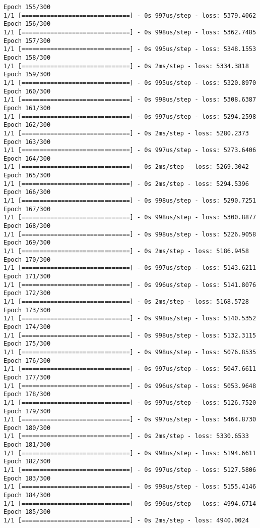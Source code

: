 \documentclass[11pt]{article}
\begin{document}
\begin{Verbatim}[commandchars=\\\{\}]
Epoch 155/300
1/1 [==============================] - 0s 997us/step - loss: 5379.4062
Epoch 156/300
1/1 [==============================] - 0s 998us/step - loss: 5362.7485
Epoch 157/300
1/1 [==============================] - 0s 995us/step - loss: 5348.1553
Epoch 158/300
1/1 [==============================] - 0s 2ms/step - loss: 5334.3818
Epoch 159/300
1/1 [==============================] - 0s 995us/step - loss: 5320.8970
Epoch 160/300
1/1 [==============================] - 0s 998us/step - loss: 5308.6387
Epoch 161/300
1/1 [==============================] - 0s 997us/step - loss: 5294.2598
Epoch 162/300
1/1 [==============================] - 0s 2ms/step - loss: 5280.2373
Epoch 163/300
1/1 [==============================] - 0s 997us/step - loss: 5273.6406
Epoch 164/300
1/1 [==============================] - 0s 2ms/step - loss: 5269.3042
Epoch 165/300
1/1 [==============================] - 0s 2ms/step - loss: 5294.5396
Epoch 166/300
1/1 [==============================] - 0s 998us/step - loss: 5290.7251
Epoch 167/300
1/1 [==============================] - 0s 998us/step - loss: 5300.8877
Epoch 168/300
1/1 [==============================] - 0s 998us/step - loss: 5226.9058
Epoch 169/300
1/1 [==============================] - 0s 2ms/step - loss: 5186.9458
Epoch 170/300
1/1 [==============================] - 0s 997us/step - loss: 5143.6211
Epoch 171/300
1/1 [==============================] - 0s 996us/step - loss: 5141.8076
Epoch 172/300
1/1 [==============================] - 0s 2ms/step - loss: 5168.5728
Epoch 173/300
1/1 [==============================] - 0s 998us/step - loss: 5140.5352
Epoch 174/300
1/1 [==============================] - 0s 998us/step - loss: 5132.3115
Epoch 175/300
1/1 [==============================] - 0s 998us/step - loss: 5076.8535
Epoch 176/300
1/1 [==============================] - 0s 997us/step - loss: 5047.6611
Epoch 177/300
1/1 [==============================] - 0s 996us/step - loss: 5053.9648
Epoch 178/300
1/1 [==============================] - 0s 997us/step - loss: 5126.7520
Epoch 179/300
1/1 [==============================] - 0s 997us/step - loss: 5464.8730
Epoch 180/300
1/1 [==============================] - 0s 2ms/step - loss: 5330.6533
Epoch 181/300
1/1 [==============================] - 0s 998us/step - loss: 5194.6611
Epoch 182/300
1/1 [==============================] - 0s 997us/step - loss: 5127.5806
Epoch 183/300
1/1 [==============================] - 0s 998us/step - loss: 5155.4146
Epoch 184/300
1/1 [==============================] - 0s 996us/step - loss: 4994.6714
Epoch 185/300
1/1 [==============================] - 0s 2ms/step - loss: 4940.0024

\end{Verbatim}
\end{document}
